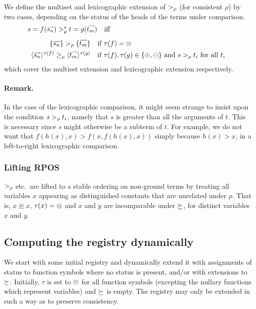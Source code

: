 \begin{defn}
We define the multiset and lexicographic extension of $>_\rho$
(for consistent $\rho$) by two cases, depending on the status of the
heads of the terms under comparison.
\[\begin{array}{l}
  s=f(\vec{s_n}) \RPOS_\rho^* t=g(\vec{t_m}) \quad\mbox{iff}\\[2ex]
\begin{array}{rl}
\{\vec{s_n}\} \RPOS_\rho \{\vec{t_m}\} &\mbox {if $\tau(f)=\Multi$}\\[1ex]
\tuple{\vec{s_n}}^{\tau(f)} \RPOSeq_\rho \tuple{\vec{t_m}}^{\tau(g)}
	&\mbox{if $\tau(f),\tau(g)\in\{\Left,\Right\}$ and $s\RPOS_\rho t_i$
for all $t_i$}
\end{array}\end{array}\]
which cover the multiset extension and lexicographic extension
respectively.
\end{defn}

\paragraph {Remark.} In the case of the lexicographic comparison, it
might seem strange to insist upon the condition $s>_\rho t_i$,
namely that $s$ is greater than all the arguments of $t$.  This is
necessary since $s$ might otherwise be a subterm of $t$. For example,
we do not want that $f(h(x),x)\greater f(x,f(h(x),x))$ simply because
$h(x)\greater x$, in a left-to-right lexicographic comparison.

\subsubsection {Lifting RPOS}
\label {lifting}

$>_\rho$ etc.\ are lifted to a stable ordering on non-ground terms by
treating all variables $x$ appearing as distinguished
constants that are unrelated under $\rho$. That is, $x\Equiv x$,
$\tau(x)=\otimes$ and $x$ and $y$ are incomparable under $\succeq$, for
distinct variables $x$ and $y$.

\subsection {Computing the registry dynamically}

We start with some initial registry and dynamically extend it with
assignments of status to function symbols where no status is present,
and/or with extensions to $\succeq$.  Initially, $\tau$ is set to
$\odot$ for all function symbols (excepting the nullary functions
which represent variables) and $\succeq$ is empty.  The registry
may only be extended in such a way as to preserve consistency.


